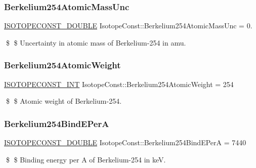 \subsubsection{\texorpdfstring{Berkelium254\+Atomic\+Mass\+Unc}{Berkelium254AtomicMassUnc}}
{\footnotesize\ttfamily \mbox{\hyperlink{group___isotope_const-_macros_ga8f45a7272ce02c0b4c65c44636ed719a}{I\+S\+O\+T\+O\+P\+E\+C\+O\+N\+S\+T\+\_\+\+D\+O\+U\+B\+LE}} Isotope\+Const\+::\+Berkelium254\+Atomic\+Mass\+Unc = 0.}

\$ \$ Uncertainty in atomic mass of Berkelium-\/254 in amu. \mbox{\label{group___isotope_const-_berkelium-_bk254_gac504e97ec9230fd71eb30f188dad530e}} 
\subsubsection{\texorpdfstring{Berkelium254\+Atomic\+Weight}{Berkelium254AtomicWeight}}
{\footnotesize\ttfamily \mbox{\hyperlink{group___isotope_const-_macros_ga5f18360b3e99483a35c32d789e62621c}{I\+S\+O\+T\+O\+P\+E\+C\+O\+N\+S\+T\+\_\+\+I\+NT}} Isotope\+Const\+::\+Berkelium254\+Atomic\+Weight = 254}

\$ \$ Atomic weight of Berkelium-\/254. \mbox{\label{group___isotope_const-_berkelium-_bk254_gabd21e63cf2d242decc880da5fc82b14e}} 
\subsubsection{\texorpdfstring{Berkelium254\+Bind\+E\+PerA}{Berkelium254BindEPerA}}
{\footnotesize\ttfamily \mbox{\hyperlink{group___isotope_const-_macros_ga8f45a7272ce02c0b4c65c44636ed719a}{I\+S\+O\+T\+O\+P\+E\+C\+O\+N\+S\+T\+\_\+\+D\+O\+U\+B\+LE}} Isotope\+Const\+::\+Berkelium254\+Bind\+E\+PerA = 7440}

\$ \$ Binding energy per A of Berkelium-\/254 in keV. \mbox{\label{group___isotope_const-_berkelium-_bk254_ga8ddfa2fb918899686fee25a64fd2f707}} 
